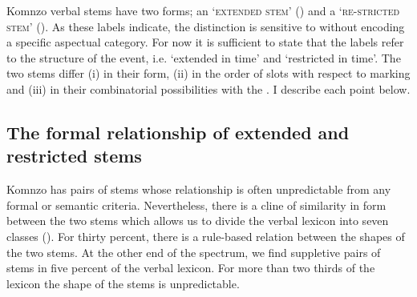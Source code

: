 Komnzo verbal stems have two forms; an `\textsc{extended stem}' (\Ext) and a `\textsc{re-stricted stem}' (\Rs). As these labels indicate, the distinction is sensitive to  without encoding a specific aspectual category. For now it is sufficient to state that the labels refer to the  structure of the event, i.e. `extended in time' and `restricted in time'. The two stems differ (i) in their form, (ii) in the order of slots with respect to  marking and (iii) in their combinatorial possibilities with the . I describe each point below.

\subsection{The formal relationship of extended and restricted stems} \label{formalrelationshipextrs}

Komnzo has pairs of  stems whose relationship is often unpredictable from any formal or semantic criteria. Nevertheless, there is a cline of similarity in form between the two stems which allows us to divide the verbal lexicon into seven classes (). For thirty percent, there is a rule-based relation between the shapes of the two stems. At the other end of the spectrum, we find suppletive pairs of stems in five percent of the verbal lexicon. For more than two thirds of the lexicon the shape of the stems is unpredictable.%


